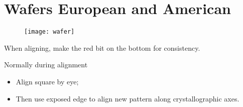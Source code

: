  \section{Wafers European and American}
  \begin{figure}[h]
	\centering
	\texttt{[image: wafer]}
  \end{figure}

  When aligning, make the red bit on the bottom for consistency.
  
  Normally during alignment
  \begin{itemize}
  	\item Align square by eye;
  	\item Then use exposed edge to align new pattern along crystallographic axes.
  \end{itemize}
 
 \newpage